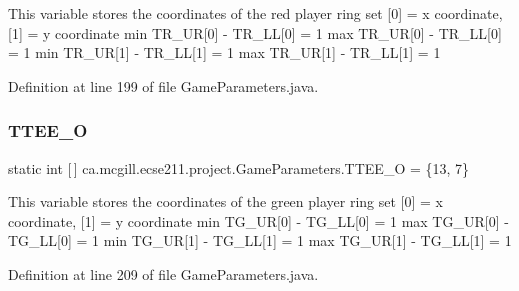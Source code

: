 This variable stores the coordinates of the red player ring set \mbox{[}0\mbox{]} = x coordinate, \mbox{[}1\mbox{]} = y coordinate min T\+R\+\_\+\+UR\mbox{[}0\mbox{]} -\/ T\+R\+\_\+\+LL\mbox{[}0\mbox{]} = 1 max T\+R\+\_\+\+UR\mbox{[}0\mbox{]} -\/ T\+R\+\_\+\+LL\mbox{[}0\mbox{]} = 1 min T\+R\+\_\+\+UR\mbox{[}1\mbox{]} -\/ T\+R\+\_\+\+LL\mbox{[}1\mbox{]} = 1 max T\+R\+\_\+\+UR\mbox{[}1\mbox{]} -\/ T\+R\+\_\+\+LL\mbox{[}1\mbox{]} = 1 

Definition at line 199 of file Game\+Parameters.\+java.

\mbox{\label{enumca_1_1mcgill_1_1ecse211_1_1project_1_1_game_parameters_a50543aed3d1731225cee6fe50ebcefe0}} 
\subsubsection{\texorpdfstring{T\+T\+E\+E\+\_\+O}{TTEE\_O}}
{\footnotesize\ttfamily  static  int \mbox{[}$\,$\mbox{]} ca.\+mcgill.\+ecse211.\+project.\+Game\+Parameters.\+T\+T\+E\+E\+\_\+O = \{13, 7\}\hspace{0.3cm}{\ttfamily [static]}}

This variable stores the coordinates of the green player ring set \mbox{[}0\mbox{]} = x coordinate, \mbox{[}1\mbox{]} = y coordinate min T\+G\+\_\+\+UR\mbox{[}0\mbox{]} -\/ T\+G\+\_\+\+LL\mbox{[}0\mbox{]} = 1 max T\+G\+\_\+\+UR\mbox{[}0\mbox{]} -\/ T\+G\+\_\+\+LL\mbox{[}0\mbox{]} = 1 min T\+G\+\_\+\+UR\mbox{[}1\mbox{]} -\/ T\+G\+\_\+\+LL\mbox{[}1\mbox{]} = 1 max T\+G\+\_\+\+UR\mbox{[}1\mbox{]} -\/ T\+G\+\_\+\+LL\mbox{[}1\mbox{]} = 1 

Definition at line 209 of file Game\+Parameters.\+java.

\mbox{\label{enumca_1_1mcgill_1_1ecse211_1_1project_1_1_game_parameters_a4b437dfb1ca3a0898631dfd670828202}} 

